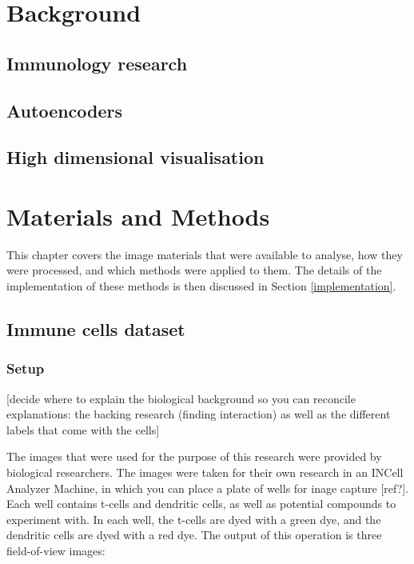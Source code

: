 \documentclass{l4proj}
\begin{document}
\chapter{Background}

\section{Immunology research}

\section{Autoencoders}

\section{High dimensional visualisation}

\chapter{Materials and Methods}

This chapter covers the image materials that were available to analyse, how they were processed, and which methods were applied to them. The details of the implementation of these methods is then discussed in Section \ref{implementation}.

\section{Immune cells dataset}

\subsection{Setup}

[decide where to explain the biological background so you can reconcile explanations: the backing research (finding interaction) as well as the different labels that come with the cells]

\bigskip
The images that were used for the purpose of this research were provided by biological researchers. The images were taken for their own research in an INCell Analyzer Machine, in which you can place a plate of wells for inage capture [ref?]. Each well contains t-cells and dendritic cells, as well as potential compounds to experiment with. In each well, the t-cells are dyed with a green dye, and the dendritic cells are dyed with a red dye. The output of this operation is three field-of-view images:
\end{document}
